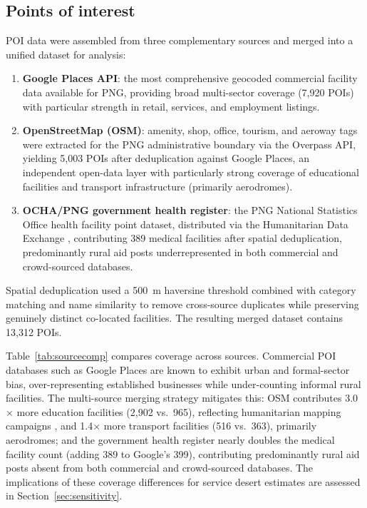 \documentclass[review,3p,authoryear]{elsarticle}
\begin{document}
\subsection{Points of interest}

POI data were assembled from three complementary sources and merged into a unified dataset for analysis:

\begin{enumerate}
\item \textbf{Google Places API}: the most comprehensive geocoded commercial facility data available for PNG, providing broad multi-sector coverage (7,920 POIs) with particular strength in retail, services, and employment listings.
\item \textbf{OpenStreetMap (OSM)}: amenity, shop, office, tourism, and aeroway tags were extracted for the PNG administrative boundary via the Overpass API, yielding 5,003 POIs after deduplication against Google Places, an independent open-data layer with particularly strong coverage of educational facilities and transport infrastructure (primarily aerodromes).
\item \textbf{OCHA/PNG government health register}: the PNG National Statistics Office health facility point dataset, distributed via the Humanitarian Data Exchange \citep{hdx2018png}, contributing 389 medical facilities after spatial deduplication, predominantly rural aid posts underrepresented in both commercial and crowd-sourced databases.
\end{enumerate}

Spatial deduplication used a \SI{500}{\metre} haversine threshold combined with category matching and name similarity to remove cross-source duplicates while preserving genuinely distinct co-located facilities. The resulting merged dataset contains 13,312 POIs.

Table~\ref{tab:sourcecomp} compares coverage across sources. Commercial POI databases such as Google Places are known to exhibit urban and formal-sector bias, over-representing established businesses while under-counting informal rural facilities. The multi-source merging strategy mitigates this: OSM contributes 3.0$\times$ more education facilities (2,902 vs.\ 965), reflecting humanitarian mapping campaigns \citep{barrington2017}, and 1.4$\times$ more transport facilities (516 vs.\ 363), primarily aerodromes; and the government health register nearly doubles the medical facility count (adding 389 to Google's 399), contributing predominantly rural aid posts absent from both commercial and crowd-sourced databases. The implications of these coverage differences for service desert estimates are assessed in Section~\ref{sec:sensitivity}.
\end{document}
